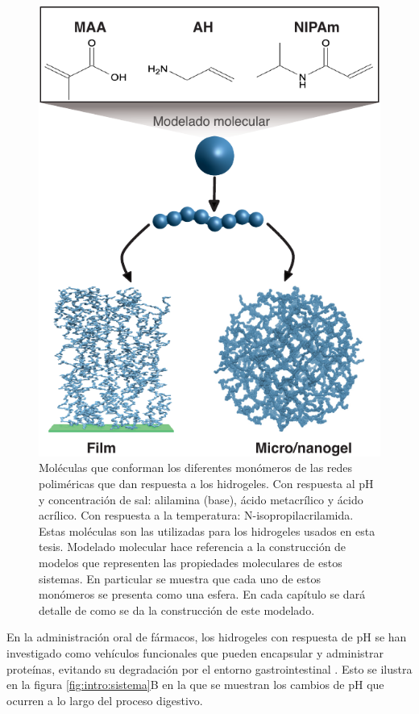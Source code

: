 \begin{figure}[!htb]
	\centering
	\includegraphics[width=0.75\linewidth]{Figures/modelos/hidrogeles.pdf}
	\caption{Mol\'eculas  que conforman los diferentes mon\'omeros de las redes polim\'ericas que dan respuesta a los hidrogeles. Con respuesta al pH y concentraci\'on de sal: alilamina (base),  \'acido metacr\'ilico y \'acido acr\'ilico. Con respuesta a la temperatura: N-isopropilacrilamida.
		Estas mol\'eculas son las utilizadas para los hidrogeles usados en esta tesis. Modelado molecular hace referencia a la construcci\'on  de modelos que representen las propiedades moleculares de estos sistemas. En particular se muestra que cada uno de estos mon\'omeros se presenta como una esfera. En cada cap\'itulo se dar\'a detalle de como se da la construcci\'on de este modelado. }
	\label{fig:intro:acidos-aa-maa}
\end{figure}


En la administraci\'on oral de f\'armacos, los hidrogeles con respuesta de pH se han investigado como veh\'iculos funcionales que pueden encapsular y administrar prote\'inas, evitando su degradaci\'on por el entorno gastrointestinal \cite{malmsten2010biomacromolecules,renukuntla2013approaches,koetting2014ph}. Esto se ilustra en la figura \ref{fig:intro:sistema}B en la que se muestran los cambios de pH que ocurren a lo largo del proceso digestivo.


